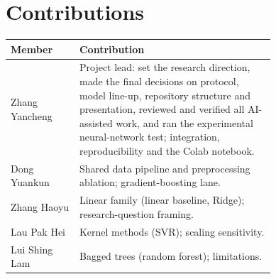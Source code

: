 \section*{Contributions}

\begin{table}[h]
\centering\small
\begin{tabular}{@{}l p{0.74\linewidth}@{}}
\toprule
Member & Contribution \\
\midrule
Zhang Yancheng & Project lead: set the research direction, made the final decisions on
protocol, model line-up, repository structure and presentation, reviewed and verified
all AI-assisted work, and ran the experimental neural-network test; integration,
reproducibility and the Colab notebook. \\
Dong Yuankun & Shared data pipeline and preprocessing ablation; gradient-boosting lane. \\
Zhang Haoyu & Linear family (linear baseline, Ridge); research-question framing. \\
Lau Pak Hei & Kernel methods (SVR); scaling sensitivity. \\
Lui Shing Lam & Bagged trees (random forest); limitations. \\
\bottomrule
\end{tabular}
\end{table}
